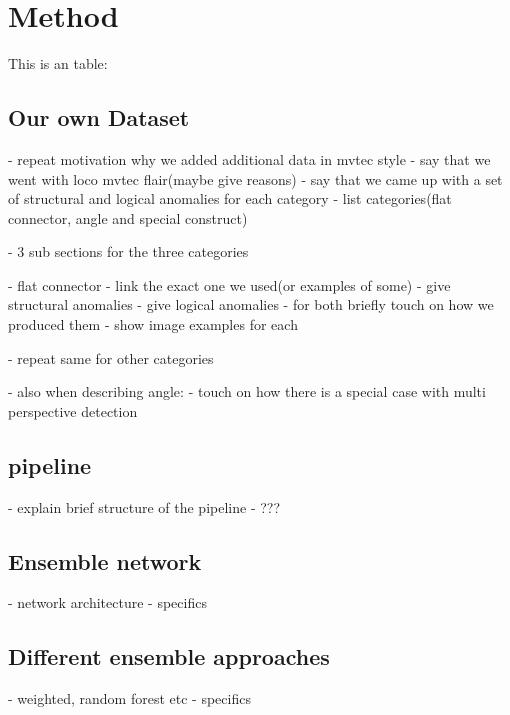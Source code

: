 \chapter{Method}
\label{chap:method}
This is an table:



\section{Our own Dataset}
- repeat motivation why we added additional data in mvtec style
- say that we went with loco mvtec flair(maybe give reasons)
- say that we came up with a set of structural and logical anomalies for each category
- list categories(flat connector, angle and special construct)

- 3 sub sections for the three categories

- flat connector
- link the exact one we used(or examples of some)
- give structural anomalies
- give logical anomalies
- for both briefly touch on how we produced them
- show image examples for each

- repeat same for other categories

- also when describing angle:
- touch on how there is a special case with multi perspective detection


\section{pipeline}
- explain brief structure of the pipeline
- ???


\section{Ensemble network}
- network architecture
- specifics

\section{Different ensemble approaches}
- weighted, random forest etc 
- specifics
